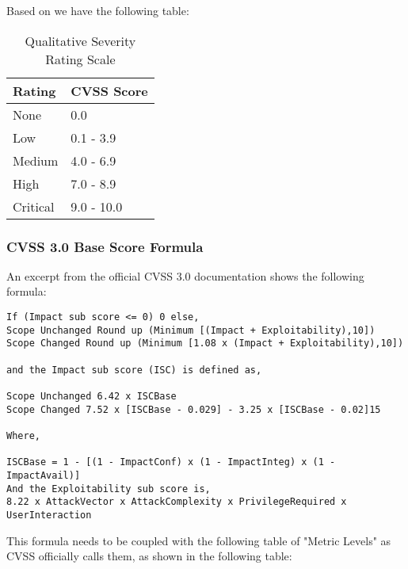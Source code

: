 Based on \parencite{cvss3} we have the following table:

\begin{table}[!htb]
	\centering
	\caption{Qualitative Severity Rating Scale}
	\begin{tabular}{ |p{4cm}||p{9cm}|  }
		\hline
		Rating & CVSS Score\\
		\hline
		None   & 0.0  \\
		Low &   0.1 - 3.9\\
		Medium & 4.0 - 6.9 \\
		High    & 7.0 - 8.9 \\
		Critical    & 9.0 - 10.0 \\
		\hline
	\end{tabular}
\end{table}

\subsubsection{CVSS 3.0 Base Score Formula}

An excerpt from the official CVSS 3.0 documentation \parencite{cvss3} shows the following formula:

\begin{verbatim}
If (Impact sub score <= 0) 0 else,
Scope Unchanged Round up (Minimum [(Impact + Exploitability),10])
Scope Changed Round up (Minimum [1.08 x (Impact + Exploitability),10])

and the Impact sub score (ISC) is defined as,

Scope Unchanged 6.42 x ISCBase
Scope Changed 7.52 x [ISCBase - 0.029] - 3.25 x [ISCBase - 0.02]15

Where,

ISCBase = 1 - [(1 - ImpactConf) x (1 - ImpactInteg) x (1 - ImpactAvail)]
And the Exploitability sub score is,
8.22 x AttackVector x AttackComplexity x PrivilegeRequired x UserInteraction
\end{verbatim}

This formula needs to be coupled with the following table of "Metric Levels" as CVSS officially calls them, as shown in the following table:

